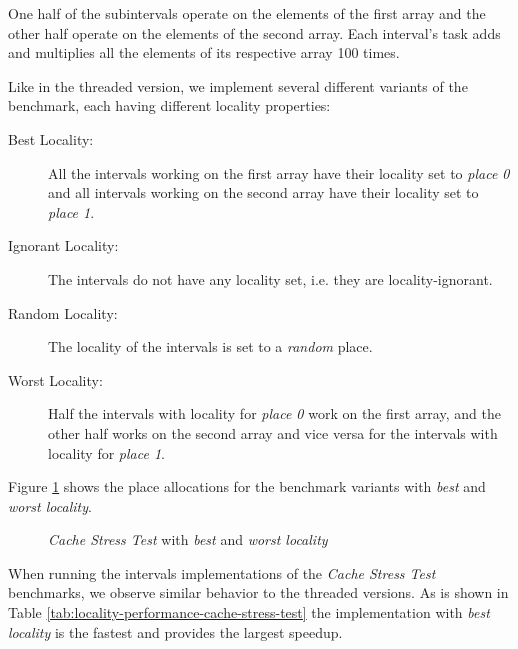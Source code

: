 One half of the subintervals operate on the elements of the first
array and the other half operate on the elements of the second
array. Each interval's task adds and multiplies all the elements of
its respective array 100 times.

Like in the threaded version, we implement several different variants
of the benchmark, each having different locality properties:

\begin{description}
\item[Best Locality:] All the intervals working on the first array
  have their locality set to \emph{place 0} and all intervals working
  on the second array have their locality set to \emph{place 1}.
\item[Ignorant Locality:] The intervals do not have any locality set,
  i.e. they are locality-ignorant.
\item[Random Locality:] The locality of the intervals is set to a
  \emph{random} place.
\item[Worst Locality:] Half the intervals with locality for
  \emph{place 0} work on the first array, and the other half works on
  the second array and vice versa for the intervals with locality for
  \emph{place 1}.
\end{description}

Figure \ref{fig:locality-performance-cache-stress-test-mafushi} shows
the place allocations for the benchmark variants with \emph{best} and
\emph{worst locality}.

\begin{figure}[!ht]
  \centering
  \caption{\emph{Cache Stress Test} with \emph{best} and \emph{worst
      locality}}
  \label{fig:locality-performance-cache-stress-test-mafushi}
\end{figure}

When running the intervals implementations of the \emph{Cache Stress
  Test} benchmarks, we observe similar behavior to the threaded
versions. As is shown in Table
\ref{tab:locality-performance-cache-stress-test} the implementation
with \emph{best locality} is the fastest and provides the largest
speedup.

